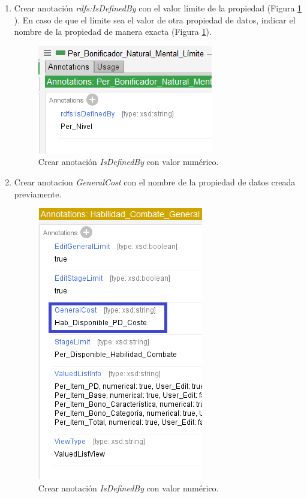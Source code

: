 \begin{enumerate}
    \item Crear anotación \textit{rdfs:IsDefinedBy} con el valor límite de la propiedad
    (Figura \ref*{MultipleChoice_4} ). En caso de que el límite sea el valor de otra propiedad de datos, indicar 
    el nombre de la propiedad de manera exacta (Figura \ref*{MultipleChoice_4}).
    \begin{figure}[H]
        \centering
        \includegraphics[scale=0.6]{Figures/Protege/MultipleChoice_4.png}
        \caption{Crear anotación \textit{IsDefinedBy} con valor numérico.}
        \label{MultipleChoice_4}
    \end{figure}
    \item Crear anotacion \textit{GeneralCost} con el nombre de la propiedad de datos creada previamente.
    \begin{figure}[H]
        \centering
        \includegraphics[scale=0.6]{Figures/Protege/MultipleChoice_5.png}
        \caption{Crear anotación \textit{IsDefinedBy} con valor numérico.}
        \label{MultipleChoice_5}
    \end{figure}

\end{enumerate}

